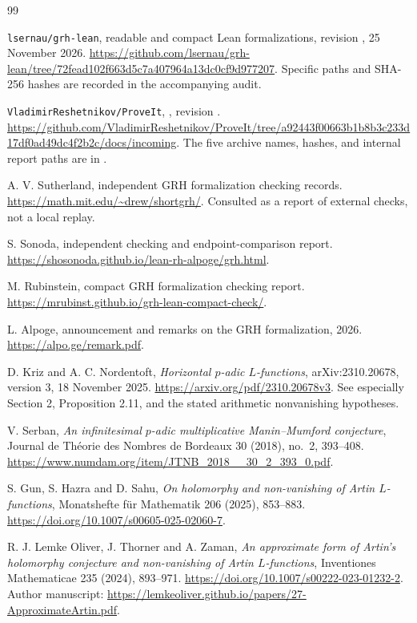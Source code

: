 \begin{thebibliography}{99}

\texttt{lsernau/grh-lean}, readable and compact Lean formalizations,
revision ,
25 November 2026.
\url{https://github.com/lsernau/grh-lean/tree/72fead102f663d5c7a407964a13dc0cf9d977207}.
Specific paths and SHA-256 hashes are recorded in the accompanying audit.

\texttt{VladimirReshetnikov/ProveIt}, ,
revision .
\url{https://github.com/VladimirReshetnikov/ProveIt/tree/a92443f00663b1b8b3c233d17df0ad49dc4f2b2c/docs/incoming}.
The five archive names, hashes, and internal report paths are in
.

A. V. Sutherland, independent GRH formalization checking records.
\url{https://math.mit.edu/~drew/shortgrh/}.
Consulted as a report of external checks, not a local replay.

S. Sonoda, independent checking and endpoint-comparison report.
\url{https://shosonoda.github.io/lean-rh-alpoge/grh.html}.

M. Rubinstein, compact GRH formalization checking report.
\url{https://mrubinst.github.io/grh-lean-compact-check/}.

L. Alpoge, announcement and remarks on the GRH formalization, 2026.
\url{https://alpo.ge/remark.pdf}.

D. Kriz and A. C. Nordentoft, \emph{Horizontal \(p\)-adic \(L\)-functions},
arXiv:2310.20678, version 3, 18 November 2025.
\url{https://arxiv.org/pdf/2310.20678v3}.
See especially Section 2, Proposition 2.11, and the stated arithmetic
nonvanishing hypotheses.

V. Serban, \emph{An infinitesimal \(p\)-adic multiplicative Manin--Mumford
conjecture}, Journal de Th\'eorie des Nombres de Bordeaux
30 (2018), no.~2, 393--408.
\url{https://www.numdam.org/item/JTNB_2018__30_2_393_0.pdf}.

S. Gun, S. Hazra and D. Sahu, \emph{On holomorphy and non-vanishing of
Artin \(L\)-functions}, Monatshefte f\"ur Mathematik 206 (2025), 853--883.
\url{https://doi.org/10.1007/s00605-025-02060-7}.

R. J. Lemke Oliver, J. Thorner and A. Zaman,
\emph{An approximate form of Artin's holomorphy conjecture and
non-vanishing of Artin \(L\)-functions},
Inventiones Mathematicae 235 (2024), 893--971.
\url{https://doi.org/10.1007/s00222-023-01232-2}.
Author manuscript:
\url{https://lemkeoliver.github.io/papers/27-ApproximateArtin.pdf}.


\end{thebibliography}
